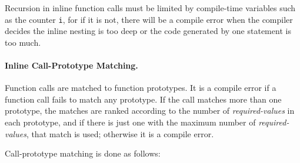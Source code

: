 \documentclass[12pt]{article}
\newcommand{\subsubsubsection}[1]{\paragraph[#1]{#1.}}
\begin{document}
Recursion in inline function calls must be limited by compile-time
variables such as the counter {\tt i}, for if it is not, there
will be a compile error when the compiler decides the inline nesting
is too deep or the code generated by one statement is too much.

\subsubsubsection{Inline Call-Prototype Matching}
\label{INLINE-CALL-PROTOTYPE-MATCHING}

Function calls are matched to function prototypes.  It is
a compile error if a function call fails to match any
prototype.  If the call matches more than one prototype, the
matches are ranked according to the number of {\em required-values}
in each prototype, and if there is just one with the maximum
number of {\em required-values}, that match is used; otherwise
it is a compile error.

Call-prototype matching is done as follows:
\end{document}
